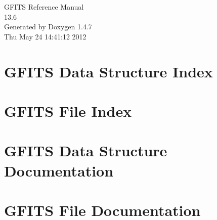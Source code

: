 \documentclass[a4paper]{book}
\begin{document}
\begin{titlepage}
\vspace*{7cm}
\begin{center}
{\Large GFITS Reference Manual\\[1ex]\large 13.6 }\\
\vspace*{1cm}
{\large Generated by Doxygen 1.4.7}\\
\vspace*{0.5cm}
{\small Thu May 24 14:41:12 2012}\\
\end{center}
\end{titlepage}
\clearemptydoublepage
{}
\tableofcontents
\clearemptydoublepage
{}
\chapter{GFITS Data Structure Index}

\chapter{GFITS File Index}

\chapter{GFITS Data Structure Documentation}







\chapter{GFITS File Documentation}









\printindex
\end{document}

